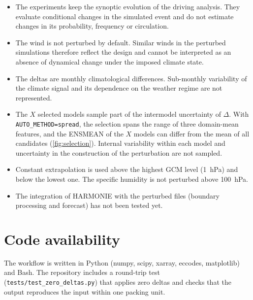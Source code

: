 \documentclass[11pt,a4paper]{article}
\newcommand{\code}[1]{\texttt{#1}}
\begin{document}
\begin{itemize}
  \item The experiments keep the synoptic evolution of the driving analysis.
    They evaluate conditional changes in the simulated event and do not
    estimate changes in its probability, frequency or circulation.
  \item The wind is not perturbed by default. Similar winds in the
    perturbed simulations therefore reflect the design and cannot be
    interpreted as an absence of dynamical change under the imposed
    climate state.
  \item The deltas are monthly climatological differences. Sub-monthly
    variability of the climate signal and its dependence on the weather
    regime are not represented.
  \item The $X$ selected models sample part of the intermodel uncertainty of
    $\Delta$. With \code{AUTO\_METHOD=spread}, the selection spans the range
    of three domain-mean features, and the ENSMEAN of the $X$ models can
    differ from the mean of all candidates (\cref{fig:selection}). Internal
    variability within each model and uncertainty in the construction of the
    perturbation are not sampled.
  \item Constant extrapolation is used above the highest GCM level
    (\SI{1}{hPa}) and below the lowest one. The specific humidity is not
    perturbed above \SI{100}{hPa}.
  \item The integration of HARMONIE with the perturbed files (boundary
    processing and forecast) has not been tested yet.
\end{itemize}

\section*{Code availability}
The workflow is written in Python (numpy, scipy, xarray, eccodes, matplotlib)
and Bash. The repository includes a round-trip test
(\code{tests/test\_zero\_deltas.py}) that applies zero deltas and checks that
the output reproduces the input within one packing unit.
\end{document}
